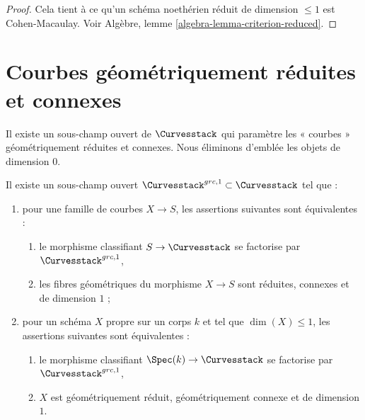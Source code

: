 \begin{proof}
Cela tient à ce qu'un schéma noethérien réduit de
dimension $\leq 1$ est Cohen-Macaulay. Voir
Algèbre, lemme \ref{algebra-lemma-criterion-reduced}.
\end{proof}






\section{Courbes géométriquement réduites et connexes}
\label{section-geometrically-reduced-connected}

\noindent
Il existe un sous-champ ouvert de $\Curvesstack$ qui paramètre
les « courbes » géométriquement réduites et connexes.
Nous éliminons d'emblée les objets de dimension $0$.

\begin{lemma}
\label{lemma-geometrically-reduced-connected-1-curves}
Il existe un sous-champ ouvert $\Curvesstack^{grc, 1} \subset \Curvesstack$
tel que :
\begin{enumerate}
\item pour une famille de courbes $X \to S$, les assertions suivantes
sont équivalentes :
\begin{enumerate}
\item le morphisme classifiant $S \to \Curvesstack$ se factorise par
$\Curvesstack^{grc, 1}$,
\item les fibres géométriques du morphisme $X \to S$ sont
réduites, connexes et de dimension $1$ ;
\end{enumerate}
\item pour un schéma $X$ propre sur un corps $k$ et tel que $\dim(X) \leq 1$,
les assertions suivantes sont équivalentes :
\begin{enumerate}
\item le morphisme classifiant $\Spec(k) \to \Curvesstack$ se factorise par
$\Curvesstack^{grc, 1}$,
\item $X$ est géométriquement réduit, géométriquement connexe
et de dimension $1$.
\end{enumerate}
\end{enumerate}
\end{lemma}

